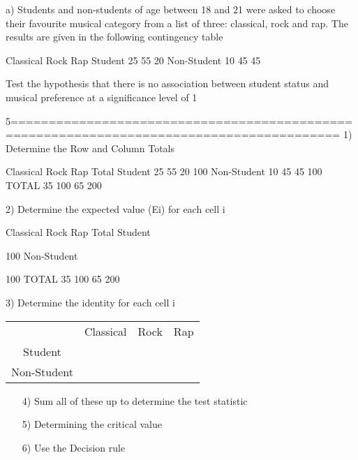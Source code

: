 \documentclass[00-IntroStatsMaster.tex]{subfiles}
\begin{document}
a) Students and non-students of age between 18 and 21 were asked to choose their favourite musical category from a list of three: classical, rock and rap. The results are given in the following contingency table


Classical
Rock
Rap
Student
25
55
20
Non-Student
10
45
45

Test the hypothesis that there is no association between student status and musical preference at a significance level of 1%

5=========================================================================================%
1) Determine the Row and Column Totals

Classical
Rock
Rap
Total
Student
25
55
20
100
Non-Student
10
45
45
100
TOTAL
35
100
65
200

2) Determine the expected value (Ei)  for each cell i

Classical
Rock
Rap
Total
Student



100
Non-Student



100
TOTAL
35
100
65
200



3) Determine the identity  for each cell i

\begin{center}
\begin{tabular}{cccc}
	& Classical & Rock& Rap \\
	Student    &		   &     &     \\
	Non-Student&           &     &     \\
\end{tabular}
\end{center}



\begin{itemize}
	\item[4)] Sum all of these up to determine the test statistic
	
	\item[5)] Determining the critical value
	
\item[6)] Use the Decision rule
\end{itemize}
\end{document}
